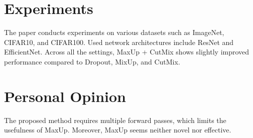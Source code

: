 \documentclass[10pt,twocolumn,letterpaper]{article}
\begin{document}
\section{Experiments}
The paper conducts experiments on various datasets such as ImageNet, CIFAR10, and CIFAR100. Used network architectures include ResNet and EfficientNet. Across all the settings, MaxUp + CutMix shows slightly improved performance compared to Dropout, MixUp, and CutMix.

\section{Personal Opinion}
The proposed method requires multiple forward passes, which limits the usefulness of MaxUp. Moreover, MaxUp seems neither novel nor effective.
\end{document}
